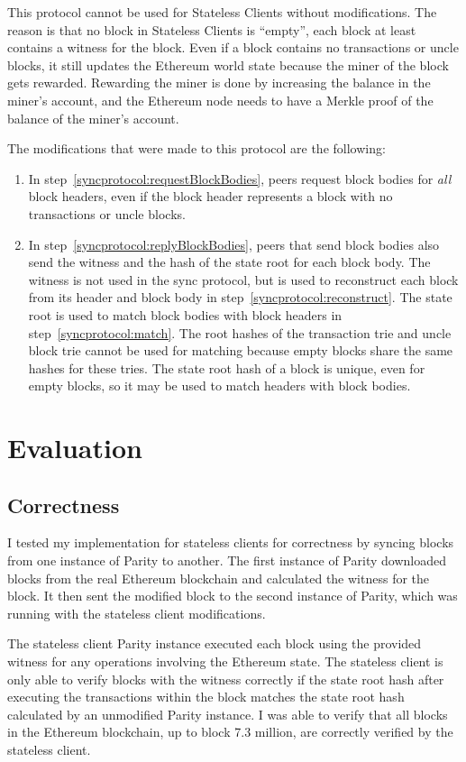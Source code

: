 \documentclass[12pt]{article}
\newcounter{protocol}
\begin{document}
This protocol cannot be used for Stateless Clients without modifications. The reason is that no block in Stateless Clients is ``empty'', each block at least contains a witness for the block. Even if a block contains no transactions or uncle blocks, it still updates the Ethereum world state because the miner of the block gets rewarded. Rewarding the miner is done by increasing the balance in the miner's account, and the Ethereum node needs to have a Merkle proof of the balance of the miner's account.

The modifications that were made to this protocol are the following:
\begin{enumerate}
  \item In step~\ref{syncprotocol:requestBlockBodies}, peers request block bodies for \emph{all} block headers, even if the block header represents a block with no transactions or uncle blocks.
  \item In step~\ref{syncprotocol:replyBlockBodies}, peers that send block bodies also send the witness and the hash of the state root for each block body. The witness is not used in the sync protocol, but is used to reconstruct each block from its header and block body in step~\ref{syncprotocol:reconstruct}. The state root is used to match block bodies with block headers in step~\ref{syncprotocol:match}. The root hashes of the transaction trie and uncle block trie cannot be used for matching because empty blocks share the same hashes for these tries. The state root hash of a block is unique, even for empty blocks, so it may be used to match headers with block bodies.
\end{enumerate}


\section{Evaluation}

\subsection{Correctness}

I tested my implementation for stateless clients for correctness by syncing blocks from one instance of Parity to another. The first instance of Parity downloaded blocks from the real Ethereum blockchain and calculated the witness for the block. It then sent the modified block to the second instance of Parity, which was running with the stateless client modifications.

The stateless client Parity instance executed each block using the provided witness for any operations involving the Ethereum state. The stateless client is only able to verify blocks with the witness correctly if the state root hash after executing the transactions within the block matches the state root hash calculated by an unmodified Parity instance. I was able to verify that all blocks in the Ethereum blockchain, up to block 7.3 million, are correctly verified by the stateless client.
\end{document}
